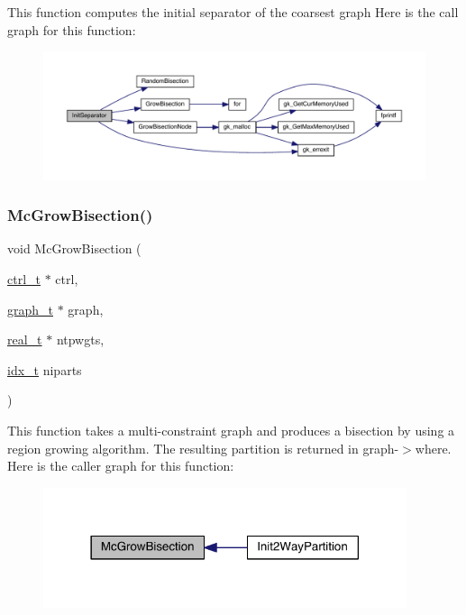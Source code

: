 This function computes the initial separator of the coarsest graph Here is the call graph for this function\+:\nopagebreak
\begin{figure}[H]
\begin{center}
\leavevmode
\includegraphics[width=350pt]{a00903_a2927ed69df973d68e918bb74f75b0b70_cgraph}
\end{center}
\end{figure}
\mbox{\label{a00903_af361dc8ba850849b9230c5c7c8c8c582}} 
\subsubsection{\texorpdfstring{Mc\+Grow\+Bisection()}{McGrowBisection()}}
{\footnotesize\ttfamily void Mc\+Grow\+Bisection (\begin{DoxyParamCaption}\item[{\hyperlink{a00742}{ctrl\+\_\+t} $\ast$}]{ctrl,  }\item[{\hyperlink{a00734}{graph\+\_\+t} $\ast$}]{graph,  }\item[{\hyperlink{a00876_a1924a4f6907cc3833213aba1f07fcbe9}{real\+\_\+t} $\ast$}]{ntpwgts,  }\item[{\hyperlink{a00876_aaa5262be3e700770163401acb0150f52}{idx\+\_\+t}}]{niparts }\end{DoxyParamCaption})}

This function takes a multi-\/constraint graph and produces a bisection by using a region growing algorithm. The resulting partition is returned in graph-\/$>$where. Here is the caller graph for this function\+:\nopagebreak
\begin{figure}[H]
\begin{center}
\leavevmode
\includegraphics[width=302pt]{a00903_af361dc8ba850849b9230c5c7c8c8c582_icgraph}
\end{center}
\end{figure}
\mbox{\label{a00903_a3ac013a2933e687d40aee2496120367e}} 
